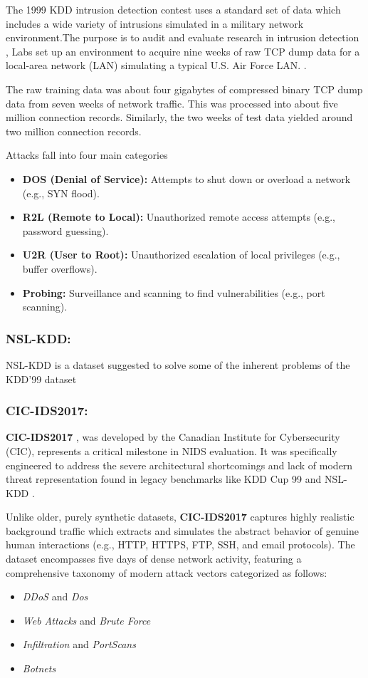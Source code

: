 \documentclass[12pt, a4paper]{report}
\begin{document}
  The 1999 KDD intrusion detection contest uses a standard set of data \cite{kddcup99} which includes a wide variety of intrusions simulated in a military network environment.The purpose is to audit  and evaluate research in intrusion detection ,
  Labs set up an environment to acquire nine weeks of raw TCP dump data for a local-area network (LAN) simulating a typical U.S. Air Force LAN. .

The raw training data was about four gigabytes of compressed binary TCP dump data from seven weeks of network traffic.  This was processed into about five million connection records.  Similarly, the two weeks of test data yielded around two million connection records.


Attacks fall into four main categories

\begin{itemize}
    \item \textbf{DOS (Denial of Service):} Attempts to shut down or overload a network (e.g., SYN flood).
    \item \textbf{R2L (Remote to Local):} Unauthorized remote access attempts (e.g., password guessing).
    \item \textbf{U2R (User to Root):} Unauthorized escalation of local privileges (e.g., buffer overflows).
    \item \textbf{Probing:} Surveillance and scanning to find vulnerabilities (e.g., port scanning).
\end{itemize}


\subsubsection{NSL-KDD:}
NSL-KDD \cite{kdd2009datset} is a dataset suggested to solve some of the inherent problems of the KDD'99 dataset

\subsubsection{CIC-IDS2017:}
\textbf{CIC-IDS2017} \cite{CICIDS2017}, was developed by the Canadian Institute for Cybersecurity (CIC), represents a critical milestone in NIDS evaluation. It was specifically engineered to address the severe architectural shortcomings and lack of modern threat representation found in legacy benchmarks like KDD Cup 99 and NSL-KDD \cite{sharafaldin2018toward}. 

Unlike older, purely synthetic datasets, \textbf{CIC-IDS2017} captures highly realistic background traffic which extracts and simulates the abstract behavior of genuine human interactions (e.g., HTTP, HTTPS, FTP, SSH, and email protocols). The dataset encompasses five days of dense network activity, featuring a comprehensive taxonomy of modern attack vectors categorized as follows:
\begin{itemize}
    \item \textit{DDoS} and \textit{Dos} 
    \item \textit{Web Attacks} and \textit{Brute Force}
    \item \textit{Infiltration} and \textit{PortScans} 
    \item \textit{Botnets}
\end{itemize}
\end{document}
